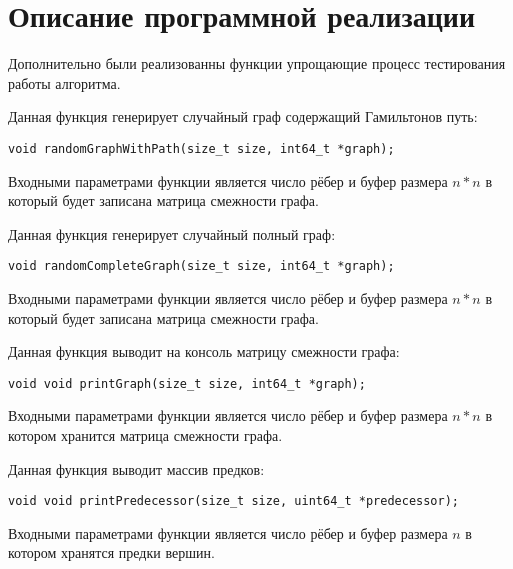 \documentclass{report}
\begin{document}
\section*{Описание программной реализации}
Дополнительно были реализованны функции упрощающие процесс тестирования работы алгоритма. 
\par Данная функция генерирует случайный граф содержащий Гамильтонов путь:
\begin{lstlisting}
void randomGraphWithPath(size_t size, int64_t *graph);
\end{lstlisting}
\par Входными параметрами функции является число рёбер и буфер размера $n*n$ в который будет записана  матрица смежности графа.
\par Данная функция генерирует случайный полный граф:
\begin{lstlisting}
void randomCompleteGraph(size_t size, int64_t *graph);
\end{lstlisting}
\par Входными параметрами функции является число рёбер и буфер размера $n*n$ в который будет записана  матрица смежности графа.
\par Данная функция выводит на консоль матрицу смежности графа:
\begin{lstlisting}
void void printGraph(size_t size, int64_t *graph);
\end{lstlisting}
\par Входными параметрами функции является число рёбер и буфер размера $n*n$ в котором хранится матрица смежности графа.
\par Данная функция выводит массив предков:
\begin{lstlisting}
void void printPredecessor(size_t size, uint64_t *predecessor);
\end{lstlisting}
\par Входными параметрами функции является число рёбер и буфер размера $n$ в котором хранятся предки вершин.
\end{document}
